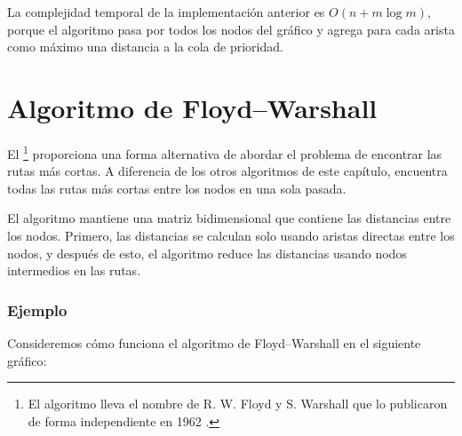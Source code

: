La complejidad temporal de la implementación anterior es
$O(n+m \log m)$, porque el algoritmo pasa por
todos los nodos del gráfico y agrega para cada arista
como máximo una distancia a la cola de prioridad.

\section{Algoritmo de Floyd–Warshall}


El \footnote{El algoritmo
lleva el nombre de R. W. Floyd y S. Warshall
que lo publicaron de forma independiente en 1962 \cite{flo62,war62}.}
proporciona una forma alternativa de abordar el problema
de encontrar las rutas más cortas.
A diferencia de los otros algoritmos de este capítulo,
encuentra todas las rutas más cortas entre los nodos
en una sola pasada.

El algoritmo mantiene una matriz bidimensional
que contiene las distancias entre los nodos.
Primero, las distancias se calculan solo usando
aristas directas entre los nodos,
y después de esto, el algoritmo reduce las distancias
usando nodos intermedios en las rutas.

\subsubsection{Ejemplo}

Consideremos cómo funciona el algoritmo de Floyd–Warshall
en el siguiente gráfico:

\begin{center}
\end{center}


